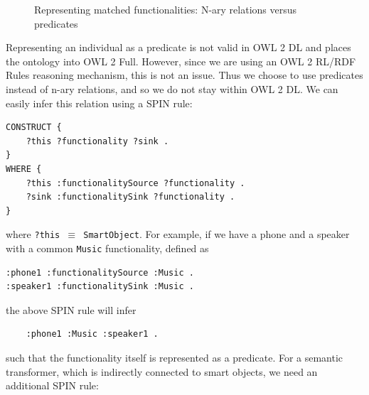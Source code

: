 \begin{figure}[bth]\centerline{
	}	
        \caption{Representing matched functionalities: N-ary relations versus predicates}
        \label{naryFunctionality}
\end{figure}

Representing an individual as a predicate is not valid in OWL 2 DL and places the ontology into OWL 2 Full. However, since we are using an OWL 2 RL/RDF Rules reasoning mechanism, this is not an issue. Thus we choose to use predicates instead of n-ary relations, and so we do not stay within OWL 2 DL. We can easily infer this relation using a \ac{SPIN} rule:

\begin{verbatim}
CONSTRUCT {
    ?this ?functionality ?sink .
}
WHERE {
    ?this :functionalitySource ?functionality .
    ?sink :functionalitySink ?functionality .
}
\end{verbatim}

where \texttt{?this \ensuremath{\equiv} SmartObject}. For example, if we have a phone and a speaker with a common \texttt{Music} functionality, defined as

\begin{verbatim}
:phone1 :functionalitySource :Music .
:speaker1 :functionalitySink :Music .
\end{verbatim}

the above \ac{SPIN} rule will infer

\begin{verbatim}
	:phone1 :Music :speaker1 .
\end{verbatim}

such that the functionality itself is represented as a predicate. For a semantic transformer, which is indirectly connected to smart objects, we need an additional \ac{SPIN} rule:

